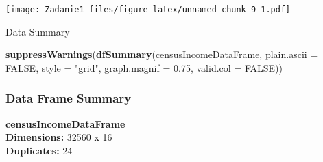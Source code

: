 \documentclass[]{article}
\newenvironment{Shaded}{\begin{snugshade}}{\end{snugshade}}
\newcommand{\DataTypeTok}[1]{\textcolor[rgb]{0.13,0.29,0.53}{#1}}
\newcommand{\FloatTok}[1]{\textcolor[rgb]{0.00,0.00,0.81}{#1}}
\newcommand{\KeywordTok}[1]{\textcolor[rgb]{0.13,0.29,0.53}{\textbf{#1}}}
\newcommand{\NormalTok}[1]{#1}
\newcommand{\OtherTok}[1]{\textcolor[rgb]{0.56,0.35,0.01}{#1}}
\newcommand{\StringTok}[1]{\textcolor[rgb]{0.31,0.60,0.02}{#1}}
\begin{document}
\texttt{[image: Zadanie1\_files/figure-latex/unnamed-chunk-9-1.pdf]}

Data Summary

\begin{Shaded}
\begin{Highlighting}[]
\KeywordTok{suppressWarnings}\NormalTok{(}\KeywordTok{dfSummary}\NormalTok{(censusIncomeDataFrame, }\DataTypeTok{plain.ascii =} \OtherTok{FALSE}\NormalTok{, }\DataTypeTok{style =} \StringTok{"grid"}\NormalTok{, }\DataTypeTok{graph.magnif =} \FloatTok{0.75}\NormalTok{, }\DataTypeTok{valid.col =} \OtherTok{FALSE}\NormalTok{))}
\end{Highlighting}
\end{Shaded}

\hypertarget{data-frame-summary}{%
\subsubsection{Data Frame Summary}\label{data-frame-summary}}

\textbf{censusIncomeDataFrame}\\
\textbf{Dimensions:} 32560 x 16\\
\textbf{Duplicates:} 24
\end{document}
